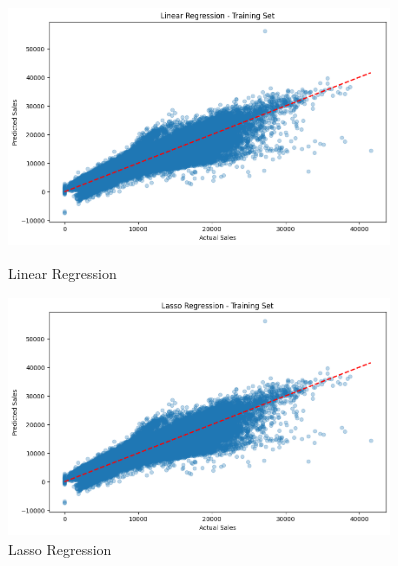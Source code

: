 \documentclass[12pt]{report}
\begin{document}
\begin{figure}[H] %
    \centering

    \begin{minipage}{0.48\textwidth}
        \centering
        \includegraphics[width=0.9\textwidth]{Linear.png}
        \caption{Linear Regression}
        \label{linear} %
    \end{minipage}\hfill
    \begin{minipage}{0.48\textwidth}
        \centering
        \includegraphics[width=0.9\textwidth]{lasso.png}
        \caption{Lasso Regression}
        \label{lasso} %
    \end{minipage}


\end{figure}
\end{document}
